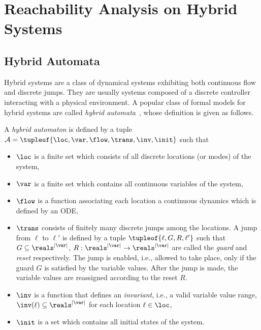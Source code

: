 \section{Reachability Analysis on Hybrid Systems}

\subsection{Hybrid Automata}

Hybrid systems are a class of dynamical systems exhibiting both continuous flow and discrete jumps. They are usually systems composed of a discrete controller interacting with a physical environment. A popular class of formal models for hybrid systems are called \emph{hybrid automata}~\cite{Alur+/1995/hybrid_systems}, whose definition is given as follows.

\begin{defn}
 A \emph{hybrid automaton} is defined by a tuple $\mathcal{A} = \tupleof{\loc, \var, \flow, \trans, \inv, \init}$ such that
 \begin{itemize}[-]
  \item $\loc$ is a finite set which consists of all discrete locations (or modes) of the system,
  
  \item $\var$ is a finite set which contains all continuous variables of the system,
  
  \item $\flow$ is a function associating each location a continuous dynamics which is defined by an ODE,
  
  \item $\trans$ consists of finitely many discrete jumps among the locations. A jump from $\ell$ to $\ell'$ is defined by a tuple $\tupleof{\ell, G, R, \ell'}$ such that $G\subseteq \reals^{|\var|}$, $R: \reals^{|\var|}\rightarrow \reals^{|\var|}$ are called the \emph{guard} and \emph{reset} respectively. The jump is enabled, i.e., allowed to take place, only if the guard $G$ is satisfied by the variable values. After the jump is made, the variable values are reassigned according to the reset $R$.
  
  \item $\inv$ is a function that defines an \emph{invariant}, i.e., a valid variable value range, $\inv(\ell) \subseteq \reals^{|\var|}$ for each location $\ell \in \loc$,
  
  \item $\init$ is a set which contains all initial states of the system.
 \end{itemize}
\end{defn}

